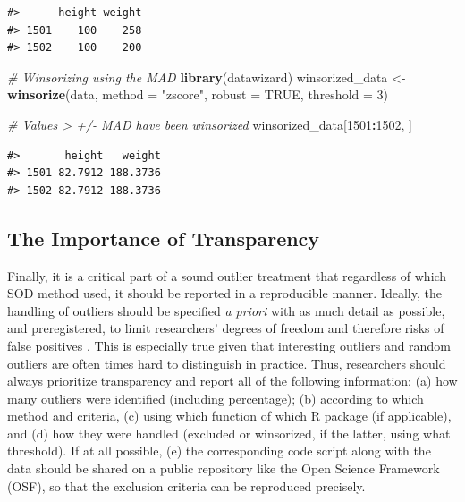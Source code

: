 \documentclass[sn-basic, lineno,pdflatex]{sn-jnl}
\newenvironment{Shaded}{\begin{snugshade}}{\end{snugshade}}
\newcommand{\AttributeTok}[1]{\textcolor[rgb]{0.13,0.29,0.53}{#1}}
\newcommand{\CommentTok}[1]{\textcolor[rgb]{0.56,0.35,0.01}{\textit{#1}}}
\newcommand{\ConstantTok}[1]{\textcolor[rgb]{0.56,0.35,0.01}{#1}}
\newcommand{\DecValTok}[1]{\textcolor[rgb]{0.00,0.00,0.81}{#1}}
\newcommand{\FunctionTok}[1]{\textcolor[rgb]{0.13,0.29,0.53}{\textbf{#1}}}
\newcommand{\NormalTok}[1]{#1}
\newcommand{\OtherTok}[1]{\textcolor[rgb]{0.56,0.35,0.01}{#1}}
\newcommand{\SpecialCharTok}[1]{\textcolor[rgb]{0.81,0.36,0.00}{\textbf{#1}}}
\newcommand{\StringTok}[1]{\textcolor[rgb]{0.31,0.60,0.02}{#1}}
\begin{document}
\begin{verbatim}
#>      height weight
#> 1501    100    258
#> 1502    100    200
\end{verbatim}

\begin{Shaded}
\begin{Highlighting}[]
\CommentTok{\# Winsorizing using the MAD}
\FunctionTok{library}\NormalTok{(datawizard)}
\NormalTok{winsorized\_data }\OtherTok{\textless{}{-}} \FunctionTok{winsorize}\NormalTok{(data, }\AttributeTok{method =} \StringTok{"zscore"}\NormalTok{, }\AttributeTok{robust =} \ConstantTok{TRUE}\NormalTok{, }\AttributeTok{threshold =} \DecValTok{3}\NormalTok{)}

\CommentTok{\# Values \textgreater{} +/{-} MAD have been winsorized}
\NormalTok{winsorized\_data[}\DecValTok{1501}\SpecialCharTok{:}\DecValTok{1502}\NormalTok{, ]}
\end{Highlighting}
\end{Shaded}

\begin{verbatim}
#>       height   weight
#> 1501 82.7912 188.3736
#> 1502 82.7912 188.3736
\end{verbatim}

\subsection{The Importance of
Transparency}\label{the-importance-of-transparency}

Finally, it is a critical part of a sound outlier treatment that
regardless of which SOD method used, it should be reported in a
reproducible manner. Ideally, the handling of outliers should be
specified \emph{a priori} with as much detail as possible, and
preregistered, to limit researchers' degrees of freedom and therefore
risks of false positives \citep{leys2019outliers}. This is especially
true given that interesting outliers and random outliers are often times
hard to distinguish in practice. Thus, researchers should always
prioritize transparency and report all of the following information: (a)
how many outliers were identified (including percentage); (b) according
to which method and criteria, (c) using which function of which R
package (if applicable), and (d) how they were handled (excluded or
winsorized, if the latter, using what threshold). If at all possible,
(e) the corresponding code script along with the data should be shared
on a public repository like the Open Science Framework (OSF), so that
the exclusion criteria can be reproduced precisely.
\end{document}
